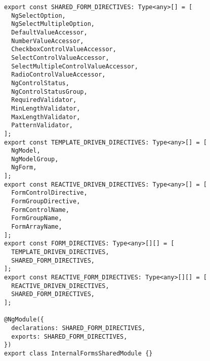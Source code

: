 \begin{verbatim}
export const SHARED_FORM_DIRECTIVES: Type<any>[] = [
  NgSelectOption,
  NgSelectMultipleOption,
  DefaultValueAccessor,
  NumberValueAccessor,
  CheckboxControlValueAccessor,
  SelectControlValueAccessor,
  SelectMultipleControlValueAccessor,
  RadioControlValueAccessor,
  NgControlStatus,
  NgControlStatusGroup,
  RequiredValidator,
  MinLengthValidator,
  MaxLengthValidator,
  PatternValidator,
];
export const TEMPLATE_DRIVEN_DIRECTIVES: Type<any>[] = [
  NgModel,
  NgModelGroup,
  NgForm,
];
export const REACTIVE_DRIVEN_DIRECTIVES: Type<any>[] = [
  FormControlDirective,
  FormGroupDirective,
  FormControlName,
  FormGroupName,
  FormArrayName,
];
export const FORM_DIRECTIVES: Type<any>[][] = [
  TEMPLATE_DRIVEN_DIRECTIVES,
  SHARED_FORM_DIRECTIVES,
];
export const REACTIVE_FORM_DIRECTIVES: Type<any>[][] = [
  REACTIVE_DRIVEN_DIRECTIVES,
  SHARED_FORM_DIRECTIVES,
];

@NgModule({
  declarations: SHARED_FORM_DIRECTIVES,
  exports: SHARED_FORM_DIRECTIVES,
})
export class InternalFormsSharedModule {}
\end{verbatim}
